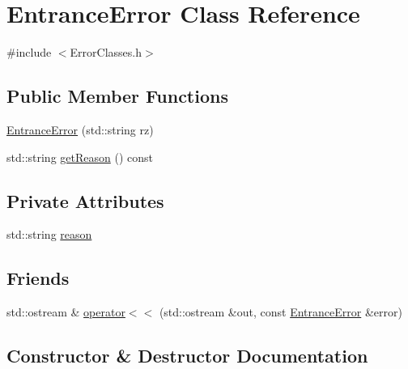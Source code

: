 \hypertarget{classEntranceError}{}\section{Entrance\+Error Class Reference}
\label{classEntranceError}


{\ttfamily \#include $<$Error\+Classes.\+h$>$}

\subsection*{Public Member Functions}
\begin{DoxyCompactItemize}
\item 
\hyperlink{classEntranceError_acf09a46ea7ce2808e377c790c7e659a6}{Entrance\+Error} (std\+::string rz)
\item 
std\+::string \hyperlink{classEntranceError_ae3dbea4a2b59281121779ae0a52069e0}{get\+Reason} () const 
\end{DoxyCompactItemize}
\subsection*{Private Attributes}
\begin{DoxyCompactItemize}
\item 
std\+::string \hyperlink{classEntranceError_ac2877dec89d77001d7362710ac940c88}{reason}
\end{DoxyCompactItemize}
\subsection*{Friends}
\begin{DoxyCompactItemize}
\item 
std\+::ostream \& \hyperlink{classEntranceError_a6213175e2716ff0d27ddb41110c85e29}{operator$<$$<$} (std\+::ostream \&out, const \hyperlink{classEntranceError}{Entrance\+Error} \&error)
\end{DoxyCompactItemize}


\subsection{Constructor \& Destructor Documentation}
